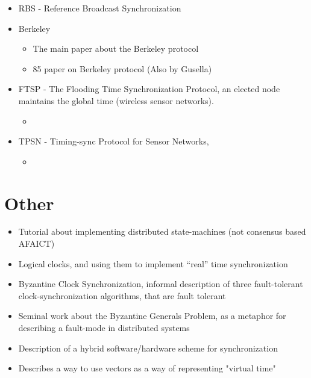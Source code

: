 \documentclass[a4paper,12pt]{article}
\begin{document}
\begin{itemize}
\item \cite{ElsonGirodEstrin02} RBS - Reference Broadcast Synchronization
\item Berkeley
  \begin{itemize}
  \item \cite{Gusella89} The main paper about the Berkeley protocol
  \item \cite{GusellaZatti85} 85 paper on Berkeley protocol (Also by Gusella)
  \end{itemize}
\item FTSP - The Flooding Time Synchronization Protocol, an elected node maintains the global time (wireless sensor networks).
    \begin{itemize}
        \item \cite{Maroti04} 
    \end{itemize}
\item TPSN - Timing-sync Protocol for Sensor Networks,
    \begin{itemize}
        \item \cite{GaneriwalKumarSrivastava03}
    \end{itemize}
\end{itemize}



\section{Other}

\begin{itemize}
\item \cite{Schneider90} Tutorial about implementing distributed state-machines (not consensus based AFAICT)
\item \cite{Lamport78} Logical clocks, and using them to implement ``real'' time synchronization
\item \cite{LamportEtAl84} Byzantine Clock Synchronization, informal description of three fault-tolerant clock-synchronization algorithms, that are fault tolerant
\item \cite{Lamport82} Seminal work about the Byzantine Generals Problem, as a metaphor for describing a fault-mode in distributed systems
\item \cite{Ramanathan90} Description of a hybrid software/hardware scheme for synchronization
\item \cite{Mattern89} Describes a way to use vectors as a way of representing "virtual time"
\end{itemize}

\printbibliography
\end{document}
